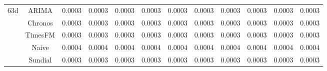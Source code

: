 \begin{table}[H]
{\begin{tabular}{cccccccccccc}
\midrule
\multirow[c]{5}{*}{63d} & ARIMA & 0.0003 & 0.0003 & 0.0003 & 0.0003 & 0.0003 & 0.0003 & 0.0003 & 0.0003 & 0.0003 & 0.0003 \\
 & Chronos & 0.0003 & 0.0003 & 0.0003 & 0.0003 & 0.0003 & 0.0003 & 0.0003 & 0.0003 & 0.0003 & 0.0003 \\
 & TimesFM & 0.0003 & 0.0003 & 0.0003 & 0.0003 & 0.0003 & 0.0003 & 0.0003 & 0.0003 & 0.0003 & 0.0003 \\
 & Naive & 0.0004 & 0.0004 & 0.0004 & 0.0004 & 0.0004 & 0.0004 & 0.0004 & 0.0004 & 0.0004 & 0.0004 \\
 & Sundial & 0.0003 & 0.0003 & 0.0003 & 0.0003 & 0.0003 & 0.0003 & 0.0003 & 0.0003 & 0.0003 & 0.0003 \\
\bottomrule
\end{tabular}

 }
\end{table}